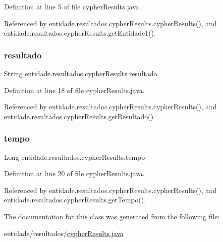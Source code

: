 Definition at line 5 of file cypher\+Results.\+java.



Referenced by entidade.\+resultados.\+cypher\+Results.\+cypher\+Results(), and entidade.\+resultados.\+cypher\+Results.\+get\+Entidade1().

\hypertarget{classentidade_1_1resultados_1_1cypherResults_af77782dbcb06c64d5d2d0b387bc9fd09}{}\label{classentidade_1_1resultados_1_1cypherResults_af77782dbcb06c64d5d2d0b387bc9fd09} 
\subsubsection{\texorpdfstring{resultado}{resultado}}
{\footnotesize\ttfamily String entidade.\+resultados.\+cypher\+Results.\+resultado\hspace{0.3cm}{\ttfamily [private]}}



Definition at line 18 of file cypher\+Results.\+java.



Referenced by entidade.\+resultados.\+cypher\+Results.\+cypher\+Results(), and entidade.\+resultados.\+cypher\+Results.\+get\+Resultado().

\hypertarget{classentidade_1_1resultados_1_1cypherResults_a98c868396c9a666d35d2a4fd9adc2e2d}{}\label{classentidade_1_1resultados_1_1cypherResults_a98c868396c9a666d35d2a4fd9adc2e2d} 
\subsubsection{\texorpdfstring{tempo}{tempo}}
{\footnotesize\ttfamily Long entidade.\+resultados.\+cypher\+Results.\+tempo\hspace{0.3cm}{\ttfamily [private]}}



Definition at line 20 of file cypher\+Results.\+java.



Referenced by entidade.\+resultados.\+cypher\+Results.\+cypher\+Results(), and entidade.\+resultados.\+cypher\+Results.\+get\+Tempo().



The documentation for this class was generated from the following file\+:\begin{DoxyCompactItemize}
\item 
entidade/resultados/\hyperlink{cypherResults_8java}{cypher\+Results.\+java}\end{DoxyCompactItemize}
